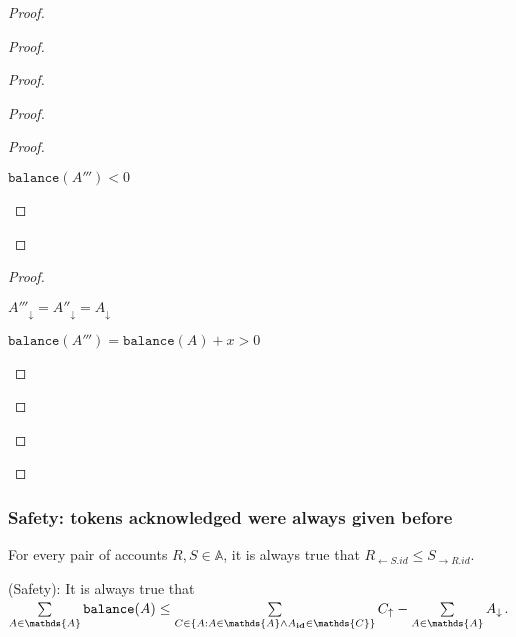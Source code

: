 \documentclass[9pt, oneside]{article}   	%
\begin{document}
\begin{proof}
\begin{proof}
\begin{proof}
\begin{proof}
				\begin{proof}
					\begin{pfenum}
						\item $\texttt{balance}(A''') < 0$
					\end{pfenum}
				\end{proof}
			\end{proof}
			
			\begin{proof}
				\begin{pfenum}
					\item $A'''_\downarrow = A''_\downarrow = A_\downarrow$	
					\item $\texttt{balance}(A''') = \texttt{balance}(A) + x > 0$	
				\end{pfenum}
			\end{proof}
			

		\end{proof}
	\end{proof}
	
	
	
	
	
	
	
	
	
\end{proof}


\subsubsection{Safety: tokens acknowledged were always given before}

For every pair of accounts $R,S \in \mathds{A}$, it is always true that $R_{\leftarrow S.id} \leq S_{\rightarrow R.id}$.

(Safety): It is always true that $\sum\limits_{A \in \mathds{A}} \texttt{balance}(A) \leq  \sum\limits_{C \in \{ A : A \in \mathds{A} \wedge A_{\scriptsize \textbf{id}} \in \mathds{C} \}} C_\uparrow - \sum\limits_{A \in \mathds{A}} A_\downarrow$.
\end{document}
